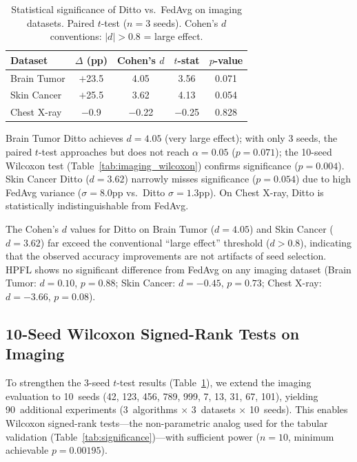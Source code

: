 \documentclass[conference]{IEEEtran}
\begin{document}
\begin{table}[htbp]
\centering
\caption{Statistical significance of Ditto vs.\ FedAvg on imaging datasets. Paired $t$-test ($n{=}3$ seeds). Cohen's $d$ conventions: $|d|{>}0.8$ = large effect.}
\label{tab:imaging_significance}
\small
\begin{tabular}{lcccc}
\toprule
\textbf{Dataset} & \textbf{$\Delta$ (pp)} & \textbf{Cohen's $d$} & \textbf{$t$-stat} & \textbf{$p$-value} \\
\midrule
Brain Tumor & $+$23.5 & 4.05 & 3.56 & 0.071 \\
Skin Cancer & $+$25.5 & 3.62 & 4.13 & 0.054 \\
Chest X-ray & $-$0.9 & $-$0.22 & $-$0.25 & 0.828 \\
\bottomrule
\end{tabular}
\par{\footnotesize Brain Tumor Ditto achieves $d{=}4.05$ (very large effect); with only 3 seeds, the paired $t$-test approaches but does not reach $\alpha{=}0.05$ ($p{=}0.071$); the 10-seed Wilcoxon test (Table~\ref{tab:imaging_wilcoxon}) confirms significance ($p{=}0.004$). Skin Cancer Ditto ($d{=}3.62$) narrowly misses significance ($p{=}0.054$) due to high FedAvg variance ($\sigma{=}8.0$pp vs.\ Ditto $\sigma{=}1.3$pp). On Chest X-ray, Ditto is statistically indistinguishable from FedAvg.}
\end{table}

The Cohen's $d$ values for Ditto on Brain Tumor ($d{=}4.05$) and Skin Cancer ($d{=}3.62$) far exceed the conventional ``large effect'' threshold ($d{>}0.8$), indicating that the observed accuracy improvements are not artifacts of seed selection. HPFL shows no significant difference from FedAvg on any imaging dataset (Brain Tumor: $d{=}0.10$, $p{=}0.88$; Skin Cancer: $d{=}-0.45$, $p{=}0.73$; Chest X-ray: $d{=}-3.66$, $p{=}0.08$).

\subsection{10-Seed Wilcoxon Signed-Rank Tests on Imaging}
\label{sec:imaging_wilcoxon}

To strengthen the 3-seed $t$-test results (Table~\ref{tab:imaging_significance}), we extend the imaging evaluation to 10~seeds (42, 123, 456, 789, 999, 7, 13, 31, 67, 101), yielding 90~additional experiments (3~algorithms $\times$ 3~datasets $\times$ 10~seeds). This enables Wilcoxon signed-rank tests---the non-parametric analog used for the tabular validation (Table~\ref{tab:significance})---with sufficient power ($n{=}10$, minimum achievable $p = 0.00195$).
\end{document}
